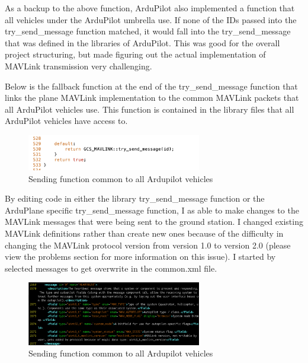\documentclass[12pt,journal,compsoc]{IEEEtran}
\begin{document}
As a backup to the above function, ArduPilot also implemented a function that all vehicles under the ArduPilot umbrella use. If none of the IDs passed into the try\_send\_message function matched, it would fall into the try\_send\_message that was defined in the libraries of ArduPilot. This was good for the overall project structuring, but made figuring out the actual implementation of MAVLink transmission very challenging. 

Below is the fallback function at the end of the try\_send\_message function that links the plane MAVLink implementation to the common MAVLink packets that all ArduPilot vehicles use. This function is contained in the library files that all ArduPilot vehicles have access to. 
\begin{figure}[h!]
\hspace*{0cm}
\centering
\includegraphics[width=3in]{Fallthrough.png}
\caption{Sending function common to all Ardupilot vehicles}
\label{fallthrough}
\end{figure}

By editing code in either the library try\_send\_message function or the ArduPlane specific try\_send\_message function, I as able to make changes to the MAVLink messages that were being sent to the ground station. 
I changed existing MAVLink definitions rather than create new ones because of the difficulty in changing the MAVLink protocol version from version 1.0 to version 2.0 (please view the problems section for more information on this issue). I started by selected messages to get overwrite in the common.xml file.


\begin{figure}[h!]
\hspace*{0cm}
\centering
\includegraphics[width=3in]{message.png}
\caption{Sending function common to all Ardupilot vehicles}
\label{fallthrough}
\end{figure}
\end{document}
